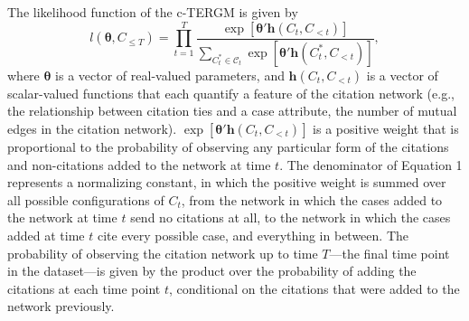 \documentclass[headsepline=true, abstracton]{scrartcl}
\begin{document}
The likelihood function of the c-TERGM is given by
\begin{equation}
l(\bm{\theta},C_{\leq T}) =  \prod_{t=1}^T \frac{ \exp \left[ {\bm{\theta}'\bm{h}(C_{t},C_{<t}) } \right] }{ \sum_{C_t^* \in \mathcal{C}_t} \exp \left[ {\bm{\theta}'\bm{h}(C^*_{t},C_{<t}) }\right]  },
\end{equation}
where $\bm{\theta}$ is a vector of real-valued parameters, and $\bm{h}(C_{t},C_{<t})$ is a vector of scalar-valued functions that each quantify a feature of the citation network (e.g., the relationship between citation ties and a case attribute, the number of mutual edges in the citation network). $\exp \left[ {\bm{\theta}'\bm{h}(C_{t},C_{<t}) } \right]$ is a positive weight that is proportional to the probability of observing any particular form of the citations and non-citations added to the network at time $t$.  The denominator of Equation 1 represents a normalizing constant, in which the positive weight is summed over all possible configurations of $C_{t}$, from the network in which the cases added to the network at time $t$ send no citations at all, to the network in which the cases added at time $t$ cite every possible case, and everything in between. The probability of observing the citation network up to time $T$---the final time point in the dataset---is given by the product over the probability of adding the citations at each time point $t$, conditional on the citations that were added to the network previously. 
\end{document}
